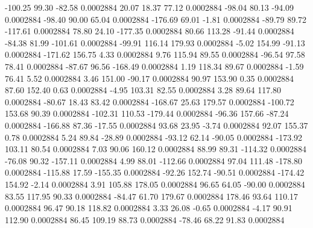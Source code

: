      -100.25       99.30      -82.58     0.0002884
       20.07       18.37       77.12     0.0002884
      -98.04       80.13      -94.09     0.0002884
      -98.40       90.00       65.04     0.0002884
     -176.69       69.01       -1.81     0.0002884
      -89.79       89.72     -117.61     0.0002884
       78.80       24.10     -177.35     0.0002884
       80.66      113.28      -91.44     0.0002884
      -84.38       81.99     -101.61     0.0002884
      -99.91      116.14      179.93     0.0002884
       -5.02      154.99      -91.13     0.0002884
     -171.62      156.75        4.33     0.0002884
        9.76      115.94       89.55     0.0002884
      -96.54       97.58       78.41     0.0002884
      -87.67       96.56     -168.49     0.0002884
        1.19      118.34       89.67     0.0002884
       -1.59       76.41        5.52     0.0002884
        3.46      151.00      -90.17     0.0002884
       90.97      153.90        0.35     0.0002884
       87.60      152.40        0.63     0.0002884
       -4.95      103.31       82.55     0.0002884
        3.28       89.64      117.80     0.0002884
      -80.67       18.43       83.42     0.0002884
     -168.67       25.63      179.57     0.0002884
     -100.72      153.68       90.39     0.0002884
     -102.31      110.53     -179.44     0.0002884
      -96.36      157.66      -87.24     0.0002884
     -166.88       87.36      -17.55     0.0002884
       93.68       23.95       -3.74     0.0002884
       92.07      155.37        0.78     0.0002884
        5.24       89.84      -28.89     0.0002884
      -93.12       62.14      -90.05     0.0002884
     -173.92      103.11       80.54     0.0002884
        7.03       90.06      160.12     0.0002884
       88.99       89.31     -114.32     0.0002884
      -76.08       90.32     -157.11     0.0002884
        4.99       88.01     -112.66     0.0002884
       97.04      111.48     -178.80     0.0002884
     -115.88       17.59     -155.35     0.0002884
      -92.26      152.74      -90.51     0.0002884
     -174.42      154.92       -2.14     0.0002884
        3.91      105.88      178.05     0.0002884
       96.65       64.05      -90.00     0.0002884
       83.55      117.95       90.33     0.0002884
      -84.47       61.70      179.67     0.0002884
      178.46       93.64      110.17     0.0002884
       96.47       90.18      118.82     0.0002884
        3.33       26.08       -0.65     0.0002884
       -4.17       90.91      112.90     0.0002884
       86.45      109.19       88.73     0.0002884
      -78.46       68.22       91.83     0.0002884
